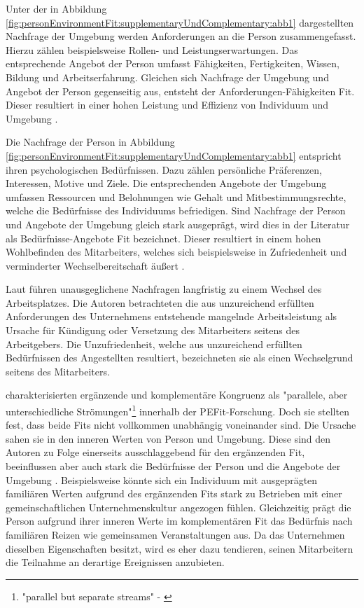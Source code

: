 Unter der in Abbildung \ref{fig:personEnvironmentFit:supplementaryUndComplementary:abb1} dargestellten Nachfrage der Umgebung werden Anforderungen an die Person zusammengefasst. Hierzu zählen beispielsweise Rollen- und Leistungserwartungen. Das entsprechende Angebot der Person umfasst Fähigkeiten, Fertigkeiten, Wissen, Bildung und Arbeitserfahrung. Gleichen sich Nachfrage der Umgebung und Angebot der Person gegenseitig aus, entsteht der Anforderungen-Fähigkeiten Fit. Dieser resultiert in einer hohen Leistung und Effizienz von Individuum und Umgebung \cite[S. 3f.]{edwards:1991}\cite[S. 5f.]{edwards:1996}\cite[S. 4]{edwards:2007}\cite[S. 7]{su:2015}.

Die Nachfrage der Person in Abbildung \ref{fig:personEnvironmentFit:supplementaryUndComplementary:abb1} entspricht ihren psychologischen Bedürfnissen. Dazu zählen persönliche Präferenzen, Interessen, Motive und Ziele. Die entsprechenden Angebote der Umgebung umfassen Ressourcen und Belohnungen wie Gehalt und Mitbestimmungsrechte, welche die Bedürfnisse des Individuums befriedigen. Sind Nachfrage der Person und Angebote der Umgebung gleich stark ausgeprägt, wird dies in der Literatur als Bedürfnisse-Angebote Fit bezeichnet. Dieser resultiert in einem hohen Wohlbefinden des Mitarbeiters, welches sich beispielsweise in Zufriedenheit und verminderter Wechselbereitschaft äußert \cite[S. 2]{edwards:2004}\cite[S. 2f.]{edwards:1996}\cite[S. 4]{edwards:2008}\cite[S. 4f.]{edwards:2007}\cite[S. 7]{su:2015}.

Laut \textcite[S. 12ff.]{workAdjustment:1964} führen unausgeglichene Nachfragen langfristig zu einem Wechsel des Arbeitsplatzes. Die Autoren betrachteten die aus unzureichend erfüllten Anforderungen des Unternehmens entstehende mangelnde Arbeitsleistung als Ursache für Kündigung oder Versetzung des Mitarbeiters seitens des Arbeitgebers. Die Unzufriedenheit, welche aus unzureichend erfüllten Bedürfnissen des Angestellten resultiert, bezeichneten sie als einen Wechselgrund seitens des Mitarbeiters.

\textcite[S. 1, Z. 2]{edwards:2004} charakterisierten ergänzende und komplementäre Kongruenz als "parallele, aber unterschiedliche Strömungen"\footnote{"parallel but separate streams" - \textcite[S. 1, Z. 2]{edwards:2004}} innerhalb der \ac{PEFit}-Forschung. Doch sie stellten fest, dass beide Fits nicht vollkommen unabhängig voneinander sind. Die Ursache sahen sie in den inneren Werten von Person und Umgebung. Diese sind den Autoren zu Folge einerseits ausschlaggebend für den ergänzenden Fit, beeinflussen aber auch stark die Bedürfnisse der Person und die Angebote der Umgebung \cite[S. 3]{edwards:2004}. Beispielsweise könnte sich ein Individuum mit ausgeprägten familiären Werten aufgrund des ergänzenden Fits stark zu Betrieben mit einer gemeinschaftlichen Unternehmenskultur angezogen fühlen. Gleichzeitig prägt die Person aufgrund ihrer inneren Werte im komplementären Fit das Bedürfnis nach familiären Reizen wie gemeinsamen Veranstaltungen aus. Da das Unternehmen dieselben Eigenschaften besitzt, wird es eher dazu tendieren, seinen Mitarbeitern die Teilnahme an derartige Ereignissen anzubieten.

